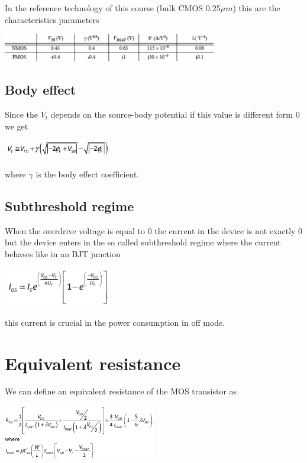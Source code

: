 In the reference technology of this course (bulk CMOS 0.25$\mu m$) this are the characteristics parameters

\centering
\includegraphics[width=0.7\textwidth]{C2_4.png}\\
\raggedright

\subsection{Body effect}

Since the $V_t$ depends on the source-body potential if this value is different form 0 we get

\centering
\includegraphics[width=0.35\textwidth]{C2_5.png}\\
\raggedright

where $\gamma$ is the body effect coefficient.

\subsection{Subthreshold regime}

When the overdrive voltage is equal to 0 the current in the device is not exactly 0 but the device enters in the so called subthreshold regime where the current behaves like in an BJT junction 

\centering
\includegraphics[width=0.35\textwidth]{C2_6.png}\\
\raggedright

this current is crucial in the power consumption in off mode.\\

\section{Equivalent resistance}
We can define an equivalent resistance of the MOS transistor as

\centering
\includegraphics[width=0.5\textwidth]{C2_7.png}\\
\raggedright


